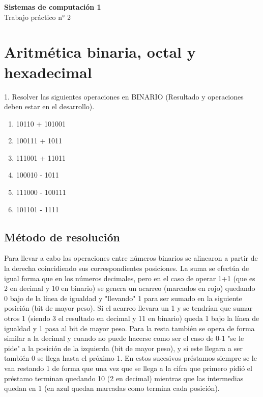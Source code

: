 \documentclass[a4paper,12pt]{article}
\begin{document}
	
	\begin{center}
		
		\LARGE \textbf{Sistemas de computación 1} \\[0.5cm]
		\LARGE Trabajo práctico n° 2 \\
	\end{center}
	
	\section*{Aritmética binaria, octal y hexadecimal}
	1. Resolver las siguientes operaciones en BINARIO (Resultado y operaciones deben estar en el desarrollo).
	\renewcommand{\theenumi}{\alph{enumi}}
	\begin{enumerate}
		\item  10110 + 101001
		\item  100111 + 1011
		\item  111001 + 11011
		\item  100010 - 1011
		\item  111000 - 100111
		\item  101101 - 1111 
	\end{enumerate}

	\subsection*{Método de resolución}
	Para llevar a cabo las operaciones entre números binarios se alinearon a partir de la derecha coincidiendo sus correspondientes posiciones. La suma se efectúa de igual forma que en los números decimales, pero en el caso de operar 1+1 (que es 2 en decimal y 10 en binario) se genera un acarreo (marcados en rojo) quedando 0 bajo de la línea de igualdad y "llevando" 1 para ser sumado en la siguiente posición (bit de mayor peso). Si el acarreo llevara un 1 y se tendrían que sumar otros 1 (siendo 3 el resultado en decimal y 11 en binario) queda 1 bajo la línea de igualdad y 1 pasa al bit de mayor peso.
	Para la resta también se opera de forma similar a la decimal y cuando no puede hacerse como ser el caso de 0-1 "se le pide" a la posición de la izquierda (bit de mayor peso), y si este llegara a ser también 0 se llega hasta el próximo 1. En estos sucesivos préstamos siempre se le van restando 1 de forma que una vez que se llega a la cifra que primero pidió el préstamo terminan quedando 10 (2 en decimal) mientras que las intermedias quedan en 1 (en azul quedan marcadas como termina cada posición).\\
		
\end{document}
